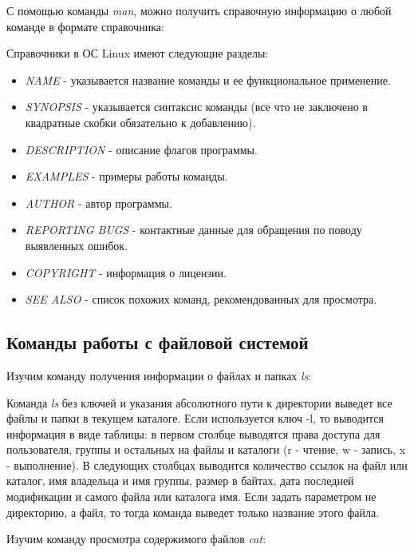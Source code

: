 \documentclass[14pt,a4paper,report]{report}
\begin{document}
С помощью команды \emph{man}, можно получить справочную информацию о любой команде в формате справочника:



Справочники в ОС Linux имеют следующие разделы:

\begin{itemize}
	\item \emph{NAME} - указывается название команды и ее функциональное применение.
	\item \emph{SYNOPSIS} - указывается синтаксис команды (все что не заключено в квадратные скобки обязательно к добавлению).
	\item \emph{DESCRIPTION} - описание флагов программы.
	\item \emph{EXAMPLES} - примеры работы команды.
	\item \emph{AUTHOR} - автор программы.
	\item \emph{REPORTING BUGS} - контактные данные для обращения по поводу выявленных ошибок.
	\item \emph{COPYRIGHT} - информация о лицензии.
	\item \emph{SEE ALSO} - список похожих команд, рекомендованных для просмотра.
\end{itemize}

\subsection{Команды работы с файловой системой}

Изучим команду получения информации о файлах и папках \emph{ls}:



Команда \emph{ls} без ключей и указания абсолютного пути к директории выведет все файлы и папки в текущем каталоге. Если используется ключ -l, то выводится информация в виде таблицы: в первом столбце выводятся права доступа для пользователя, группы и остальных на файлы и каталоги (r - чтение, w - запись, x - выполнение). В следующих столбцах выводится количество ссылок на файл или каталог, имя владельца и имя группы, размер в байтах, дата последней модификации и самого файла или каталога имя. Если задать параметром не директорию, а файл, то тогда команда выведет только название этого файла.

\clearpage

Изучим команду просмотра содержимого файлов \emph{cat}:


\end{document}

